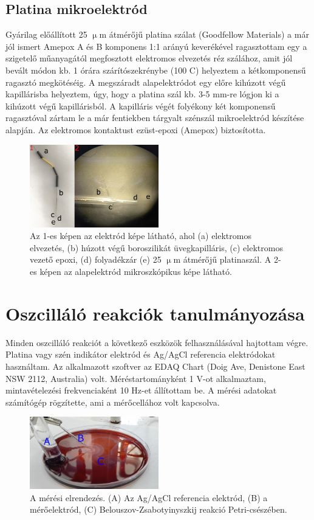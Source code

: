 \subsection{Platina mikroelektród}
Gyárilag előállított 25 $\upmu$m átmérőjű platina szálat (Goodfellow Materials) a már jól ismert Amepox A és B komponens 1:1 arányú keverékével ragasztottam egy a szigetelő műanyagától megfosztott elektromos elvezetés réz szálához, amit jól bevált módon kb. 1 órára szárítószekrénybe (100 \textdegree C) helyeztem a kétkomponensű ragasztó megkötéséig.  A megszáradt alapelektródot egy előre kihúzott végű kapillárisba helyeztem, úgy, hogy a platina szál kb. 3-5 mm-re lógjon ki a kihúzott végű kapillárisból. A kapilláris végét folyékony két komponensű ragasztóval zártam le a már fentiekben tárgyalt szénszál mikroelektród készítése alapján. Az elektromos kontaktust ezüst-epoxi (Amepox) biztosította.
\begin{figure}[h]
\centering
\includegraphics[width=0.5\textwidth]{img/platina.png}
\caption{Az 1-es képen az elektród képe látható, ahol (a) elektromos elvezetés, (b) húzott végű boroszilikát üvegkapilláris, (c) elektromos vezető epoxi, (d) folyadékzár  (e) 25 $\upmu$m átmérőjű platinaszál. A 2-es képen az alapelektród mikroszkópikus képe látható.}
\label{fig:ionophores}
\end{figure}


\section{Oszcilláló reakciók tanulmányozása} 

Minden oszcilláló reakciót a következő eszközök felhasználásával hajtottam végre. Platina vagy szén indikátor elektród és  Ag/AgCl referencia elektródokat használtam. Az alkalmazott szoftver az EDAQ Chart (Doig Ave, Denistone East NSW 2112, Australia) volt. Méréstartományként 1 V-ot alkalmaztam, mintavételezési frekvenciaként 10 Hz-et állítottam be. A mérési adatokat számítógép rögzítette, ami a mérőcellához volt kapcsolva.

\begin{figure}[h!]
\centering
\includegraphics[width=0.5\textwidth]{img/setup.png}
\caption{A mérési elrendezés. (A) Az Ag/AgCl referencia elektród, (B) a mérőelektród, (C) Belouszov-Zsabotyinyszkij reakció Petri-csészében.}
\label{fig:setup}
\end{figure}



